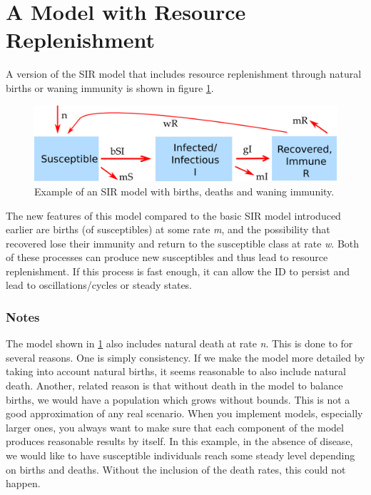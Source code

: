 \documentclass[
]{book}
\begin{document}
\hypertarget{a-model-with-resource-replenishment}{%
\section{A Model with Resource Replenishment}\label{a-model-with-resource-replenishment}}

A version of the SIR model that includes resource replenishment through natural births or waning immunity is shown in figure
\ref{fig:birthdeathdmodel}.

\begin{figure}
\includegraphics[width=24.94in]{./images/R0modelfigure} \caption{Example of an SIR model with births, deaths and waning immunity.}\label{fig:birthdeathdmodel}
\end{figure}

The new features of this model compared to the basic SIR model introduced earlier are births (of susceptibles) at some rate \emph{m}, and the possibility that recovered lose their immunity and return to the susceptible class at rate \emph{w}. Both of these processes can produce new susceptibles and thus lead to resource replenishment. If this process is fast enough, it can allow the ID to persist and lead to oscillations/cycles or steady states.

\hypertarget{mynotebox}{%
\subsubsection{Notes}\label{mynotebox}}

The model shown in \ref{fig:birthdeathdmodel} also includes natural death at rate \emph{n}. This is done to for several reasons. One is simply consistency. If we make the model more detailed by taking into account natural births, it seems reasonable to also include natural death. Another, related reason is that without death in the model to balance births, we would have a population which grows without bounds. This is not a good approximation of any real scenario. When you implement models, especially larger ones, you always want to make sure that each component of the model produces reasonable results by itself. In this example, in the absence of disease, we would like to have susceptible individuals reach some steady level depending on births and deaths. Without the inclusion of the death rates, this could not happen.
\end{document}
